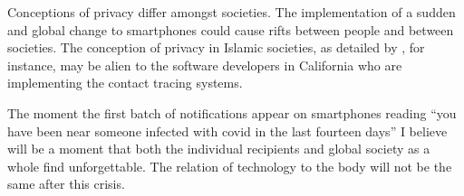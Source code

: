 \documentclass[2020/08/28 v2]{../../../coursework}
\begin{document}
Conceptions of privacy differ amongst societies. The implementation of a
sudden and global change to smartphones could cause rifts between people and
between societies. The conception of privacy in Islamic societies, as detailed
by \textcite{Abokhodair2016}, for instance, may be alien to the software
developers in California who are implementing the contact tracing systems.

The moment the first batch of notifications appear on smartphones reading
\enquote{you have been near someone infected with \ac{covid} in the last
fourteen days} I believe will be a moment that both the individual recipients
and global society as a whole find unforgettable. The relation of technology to the
body will not be the same after this crisis.

\printbibliography
\end{document}

